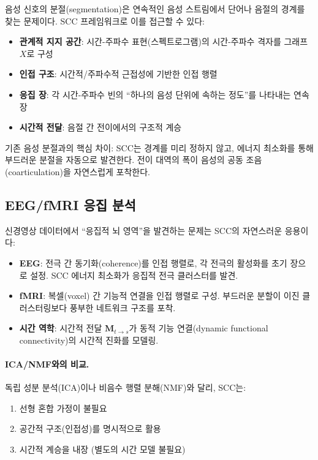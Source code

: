 음성 신호의 분절(segmentation)은 연속적인 음성 스트림에서 단어나 음절의 경계를 찾는 문제이다. SCC 프레임워크로 이를 접근할 수 있다:
\begin{itemize}
    \item \textbf{관계적 지지 공간}: 시간-주파수 표현(스펙트로그램)의 시간-주파수 격자를 그래프 $X$로 구성
    \item \textbf{인접 구조}: 시간적/주파수적 근접성에 기반한 인접 행렬
    \item \textbf{응집 장}: 각 시간-주파수 빈의 ``하나의 음성 단위에 속하는 정도''를 나타내는 연속 장
    \item \textbf{시간적 전달}: 음절 간 전이에서의 구조적 계승
\end{itemize}

기존 음성 분절과의 핵심 차이: SCC는 경계를 미리 정하지 않고, 에너지 최소화를 통해 부드러운 분절을 자동으로 발견한다. 전이 대역의 폭이 음성의 공동 조음(coarticulation)을 자연스럽게 포착한다.

\subsection{EEG/fMRI 응집 분석}

신경영상 데이터에서 ``응집적 뇌 영역''을 발견하는 문제는 SCC의 자연스러운 응용이다:
\begin{itemize}
    \item \textbf{EEG}: 전극 간 동기화(coherence)를 인접 행렬로, 각 전극의 활성화를 초기 장으로 설정. SCC 에너지 최소화가 응집적 전극 클러스터를 발견.
    \item \textbf{fMRI}: 복셀(voxel) 간 기능적 연결을 인접 행렬로 구성. 부드러운 분할이 이진 클러스터링보다 풍부한 네트워크 구조를 포착.
    \item \textbf{시간 역학}: 시간적 전달 $\mathbf{M}_{t \to s}$가 동적 기능 연결(dynamic functional connectivity)의 시간적 진화를 모델링.
\end{itemize}

\paragraph{ICA/NMF와의 비교.} 독립 성분 분석(ICA)이나 비음수 행렬 분해(NMF)와 달리, SCC는:
\begin{enumerate}
    \item 선형 혼합 가정이 불필요
    \item 공간적 구조(인접성)를 명시적으로 활용
    \item 시간적 계승을 내장 (별도의 시간 모델 불필요)
\end{enumerate}

